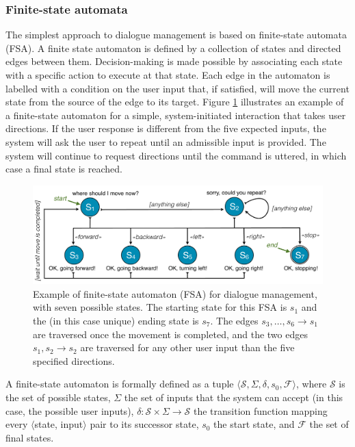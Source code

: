 \subsubsection*{Finite-state automata}

The simplest approach to dialogue management is based on finite-state automata (FSA).  A finite state automaton is defined by a collection of states and directed edges between them.  Decision-making is made possible by associating each state with a specific action to execute at that state. Each edge in the automaton is labelled with a condition on the user input that, if satisfied, will move the current state from the source of the edge to its target.  Figure \ref{fig:fsa} illustrates an example of a finite-state automaton for a simple, system-initiated interaction that takes user directions.  If the user response is different from the five expected inputs, the system will ask the user to repeat until an admissible input is provided.  The system will continue to request directions until the  command is uttered, in which case a final state is reached. 


\begin{figure}[ht]
\centering
\includegraphics[scale=0.35]{imgs/fsa.pdf}
\caption{Example of finite-state automaton (FSA) for dialogue management, with seven possible states. The starting state for this FSA is $s_1$ and the (in this case unique) ending state is $s_7$. The edges $s_3,\dots, s_6 \rightarrow s_1$ are traversed once the movement is completed, and the two edges $s_1, s_2 \rightarrow s_2$ are traversed for any other user input than the five specified directions.}
\label{fig:fsa}
\end{figure}

A finite-state automaton is formally defined as a tuple $\langle \mathcal{S}, \Sigma, \delta, s_0, \mathcal{F} \rangle$, where $\mathcal{S}$ is the set of possible states, $\Sigma$ the set of inputs that the system can accept (in this case, the possible user inputs),  $\delta: \mathcal{S} \times \Sigma \rightarrow \mathcal{S}$ the transition function mapping every $\langle$state, input$\rangle$ pair to its successor state, $s_0$ the start state, and $\mathcal{F}$ the set of final states. 

